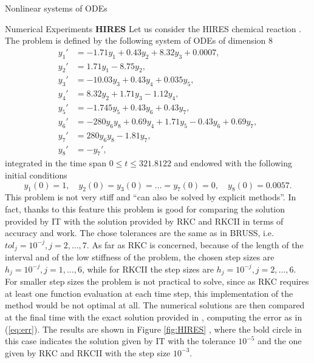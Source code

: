 \documentclass{article}
\begin{document}
\begin{section}{Nonlinear systems of ODEs}
\begin{subsection}{Numerical Experiments}
\textbf{HIRES} Let us consider the HIRES chemical reaction \cite{HW}. The problem is defined by the following system of ODEs of dimension 8
\begin{equation}\label{eq:HIRES}
\begin{aligned}
	y_1' &= -1.71y_1 + 0.43y_2 + 8.32y_3 + 0.0007, \\
	y_2' &= 1.71y_1 -8.75y_2, \\
	y_3' &= -10.03y_3 + 0.43y_4 + 0.035y_5, \\
	y_4' &= 8.32y_2 + 1.71y_3-1.12y_4, \\
	y_5' &= -1.745y_5 + 0.43y_6 + 0.43y_7, \\
	y_6' &= -280y_6y_8 + 0.69y_4 + 1.71y_5 - 0.43y_6 + 0.69y_7, \\
	y_7' &= 280y_6y_8 - 1.81y_7, \\
	y_8' &= -y_7',
\end{aligned}
\end{equation} 
integrated in the time span $0 \leq t \leq 321.8122$ and endowed with the following initial conditions
\begin{equation*}
	y_1(0) = 1, \quad y_2(0) = y_3(0) = \dots = y_7(0) = 0, \quad y_8(0) = 0.0057.
\end{equation*}
This problem is not very stiff and ``can also be solved by explicit methods''\cite{HW}. In fact, thanks to this feature this problem is good for comparing the solution provided by IT with the solution provided by RKC and RKCII in terms of accuracy and work. The chose tolerances are the same as in BRUSS, i.e. $tol_j = 10^{-j}, j = 2,\dots,7$. As far as RKC is concerned, because of the length of the interval and of the low stiffness of the problem, the chosen step sizes are $h_j = 10^{-j}, j = 1,\dots,6$, while for RKCII the step sizes are $h_j = 10^{-j}, j = 2,\dots,6$. For smaller step sizes the problem is not practical to solve, since as RKC requires at least one function evaluation at each time step, this implementation of the method would be not optimal at all. The numerical solutions are then compared at the final time with the exact solution provided in \cite{HAIR}, computing the error as in (\ref{eq:err}). The results are shown in Figure \ref{fig:HIRES} , where the bold circle in this case indicates the solution given by IT with the tolerance $10^{-5}$ and the one given by RKC and RKCII with the step size $10^{-3}$.
\begin{figure}[t!]
\centering

\end{figure}
\end{subsection}
\end{section}
\end{document}
